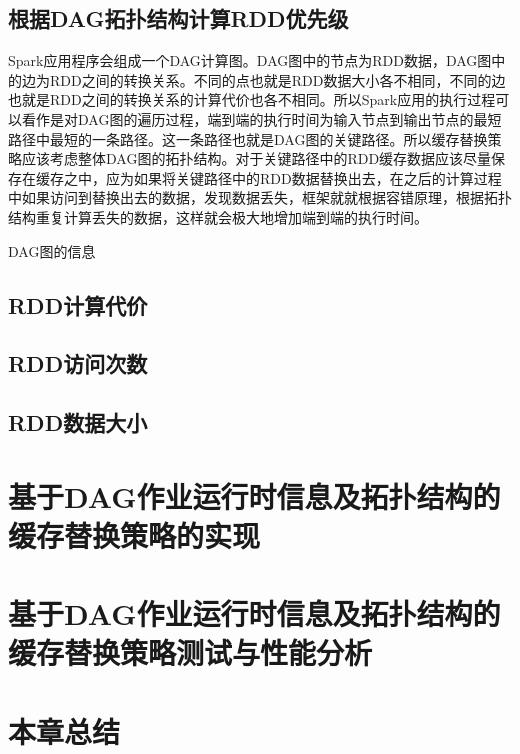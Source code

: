 \subsection{根据DAG拓扑结构计算RDD优先级}

Spark应用程序会组成一个DAG计算图。DAG图中的节点为RDD数据，DAG图中的边为RDD之间的转换关系。不同的点也就是RDD数据大小各不相同，不同的边也就是RDD之间的转换关系的计算代价也各不相同。所以Spark应用的执行过程可以看作是对DAG图的遍历过程，端到端的执行时间为输入节点到输出节点的最短路径中最短的一条路径。这一条路径也就是DAG图的关键路径。所以缓存替换策略应该考虑整体DAG图的拓扑结构。对于关键路径中的RDD缓存数据应该尽量保存在缓存之中，应为如果将关键路径中的RDD数据替换出去，在之后的计算过程中如果访问到替换出去的数据，发现数据丢失，框架就就根据容错原理，根据拓扑结构重复计算丢失的数据，这样就会极大地增加端到端的执行时间。

DAG图的信息

\subsection{RDD计算代价}

\subsection{RDD访问次数}

\subsection{RDD数据大小}

\section{基于DAG作业运行时信息及拓扑结构的缓存替换策略的实现}
\section{基于DAG作业运行时信息及拓扑结构的缓存替换策略测试与性能分析}
\section{本章总结}